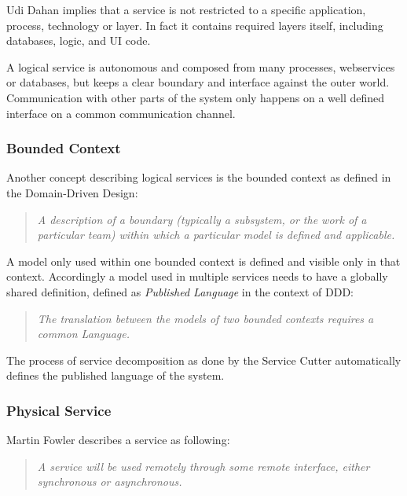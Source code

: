 Udi Dahan implies that a service is not restricted to a specific application, process, technology or layer. In fact it contains required layers itself, including databases, logic, and \gls{UI} code.

A logical service is autonomous and composed from many processes, webservices or databases, but keeps a clear boundary and interface against the outer world. Communication with other parts of the system only happens on a well defined interface on a common communication channel.

\subsubsection{Bounded Context}

Another concept describing logical services is the bounded context as defined in the Domain-Driven Design\cite{evans2014domain}:

\begin{quotation}
	\textit{A description of a boundary (typically a subsystem, or the work of a particular team) within which a particular model is defined and applicable.}
\end{quotation}

A model only used within one bounded context is defined and visible only in that context. Accordingly a model used in multiple services needs to have a globally shared definition, defined as \textit{Published Language} in the context of \gls{DDD}\cite{evans2014domain}:

\begin{quotation}
	\textit{The translation between the models of two bounded contexts requires a common Language.}
\end{quotation}

The process of service decomposition as done by the Service Cutter automatically defines the published language of the system. 

\subsubsection{Physical Service}

Martin Fowler describes a service as following:

\begin{quotation}
	\textit{A service will be used remotely through some remote interface, either synchronous or asynchronous.}\cite{fowlerIoC}
\end{quotation}

